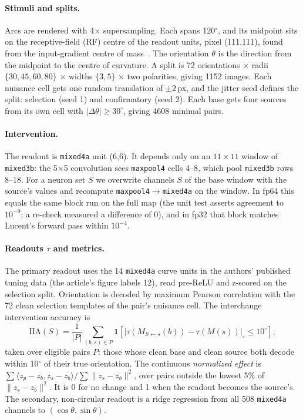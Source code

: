 \documentclass[11pt]{article}
\newcommand{\iia}{\mathrm{IIA}}
\begin{document}
\paragraph{Stimuli and splits.}
Arcs are rendered with 4$\times$ supersampling. Each spans 120$^\circ$, and its midpoint sits on the receptive-field (RF) centre of the readout units, pixel (111,111), found from the input-gradient centre of mass~\cite{luo2016erf}. The orientation $\theta$ is the direction from the midpoint to the centre of curvature. A split is 72 orientations $\times$ radii $\{30,45,60,80\}$ $\times$ widths $\{3,5\}$ $\times$ two polarities, giving 1152 images. Each nuisance cell gets one random translation of $\pm2$\,px, and the jitter seed defines the split: selection (seed 1) and confirmatory (seed 2). Each base gets four sources from its own cell with $|\Delta\theta|\ge30^\circ$, giving 4608 minimal pairs.

\paragraph{Intervention.}
The readout is \texttt{mixed4a} unit (6,6). It depends only on an $11\times11$ window of \texttt{mixed3b}: the 5$\times$5 convolution sees \texttt{maxpool4} cells 4--8, which pool \texttt{mixed3b} rows 8--18. For a neuron set $S$ we overwrite channels $S$ of the base window with the source's values and recompute \texttt{maxpool4}$\to$\texttt{mixed4a} on the window. In fp64 this equals the same block run on the full map (the unit test asserts agreement to $10^{-9}$; a re-check measured a difference of 0), and in fp32 that block matches Lucent's forward pass within $10^{-4}$.

\paragraph{Readouts $\tau$ and metrics.}
The primary readout uses the 14 \texttt{mixed4a} curve units in the authors' published tuning data (the article's figure labels 12), read pre-ReLU and z-scored on the selection split. Orientation is decoded by maximum Pearson correlation with the 72 clean selection templates of the pair's nuisance cell. The interchange intervention accuracy is
\begin{equation}
\iia(S)=\frac{1}{|P|}\sum_{(b,s)\in P}\mathbf{1}\!\left[\big|\tau(M_{S\leftarrow s}(b))-\tau(M(s))\big|_{\circ}\le10^\circ\right],
\end{equation}
taken over eligible pairs $P$: those whose clean base and clean source both decode within 10$^\circ$ of their true orientation. The continuous \emph{normalized effect} is $\sum\langle z_p-z_b,z_s-z_b\rangle/\sum\lVert z_s-z_b\rVert^2$, over pairs outside the lowest 5\% of $\lVert z_s-z_b\rVert^2$. It is 0 for no change and 1 when the readout becomes the source's. The secondary, non-circular readout is a ridge regression from all 508 \texttt{mixed4a} channels to $(\cos\theta,\sin\theta)$.
\end{document}
